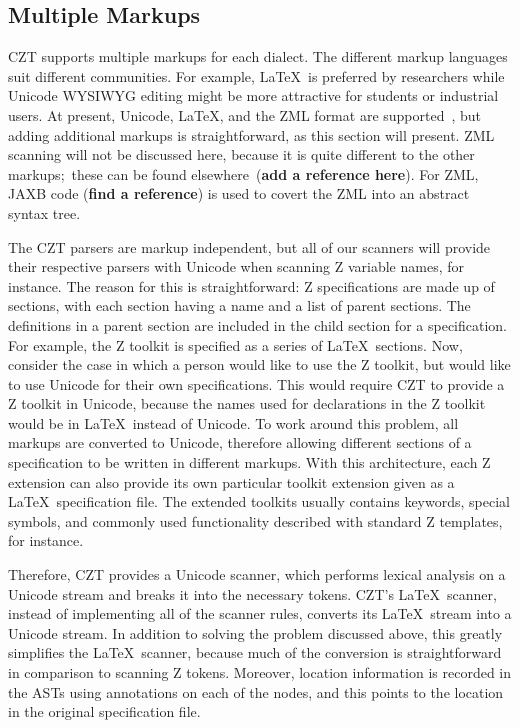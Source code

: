 \documentclass{llncs}
\begin{document}
\subsection{Multiple Markups}\label{multiple-markups}

 CZT supports multiple markups for each dialect.  The different
 markup languages suit different communities.  For example, \LaTeX\
 is preferred by researchers while Unicode WYSIWYG editing might be
 more attractive for students or industrial users. At present,
 Unicode, \LaTeX, and the ZML format are supported~\cite{UttEA:03},
 but adding additional markups is straightforward, as this section
 will present.  ZML scanning will not be discussed here, because it is
 quite different to the other markups;~these can be found elsewhere~({\bf add a reference here}).
 For ZML, JAXB code ({\bf find a reference}) is used to covert the ZML into an abstract syntax tree.

The CZT parsers are markup independent, but all of our scanners will
provide their respective parsers with Unicode when scanning Z variable
names, for instance. The reason for this is straightforward: Z specifications
are made up of sections, with each section having a name and a list of
parent sections. The definitions in a parent section are included in
the child section for a specification. For example, the Z toolkit is
specified as a series of \LaTeX\ sections. Now, consider the case in
which a person would like to use the Z toolkit, but would like to use
Unicode for their own specifications. This would require CZT to
provide a Z toolkit in Unicode, because the names used for
declarations in the Z toolkit would be in \LaTeX~instead of
Unicode. To work around this problem, all markups are converted to
Unicode, therefore allowing different sections of a specification to
be written in different markups.
With this architecture, each Z extension can also provide its own
particular toolkit extension given as a \LaTeX\ specification file.
The extended toolkits usually contains keywords, special symbols,
and commonly used functionality described with standard Z templates, for instance.

Therefore, CZT provides a Unicode scanner, which performs lexical
analysis on a Unicode stream and breaks it into the necessary
tokens. CZT's \LaTeX~scanner, instead of implementing all of the
scanner rules, converts its \LaTeX~stream into a Unicode stream. In
addition to solving the problem discussed above, this greatly
simplifies the \LaTeX~scanner, because much of the conversion is
straightforward in comparison to scanning Z tokens. Moreover, location
information is recorded in the ASTs using annotations on each of the
nodes, and this points to the location in the original specification file.
\end{document}
